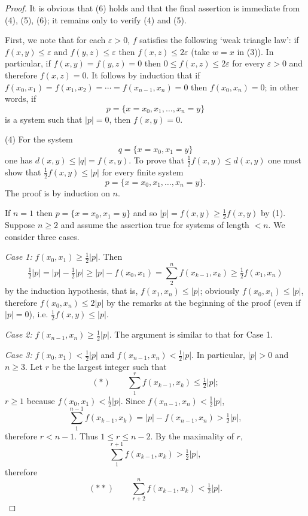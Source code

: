 \begin{proof}
    It is obvious that (6) holds and that the final assertion is immediate from (4), (5), (6); it remains only to verify (4) and (5).

    First, we note that for each $\varepsilon > 0$, $f$ satisfies the following ‘weak triangle law’: if $f(x,y) \le \varepsilon$ and $f(y,z) \le \varepsilon$ then $f(x,z) \le 2\varepsilon$ (take $w = x$ in (3)). In particular, if $f(x,y) = f(y,z) = 0$ then $0 \le f(x,z) \le 2\varepsilon$ for every $\varepsilon > 0$ and therefore $f(x,z) = 0$. It follows by induction that if $f(x_0,x_1) = f(x_1,x_2) = \cdots = f(x_{n-1},x_n) = 0$ then $f(x_0,x_n) = 0$; in other words, if
    \[
        p = \{x = x_0, x_1, \dots, x_n = y\}
    \]
    is a system such that $|p| = 0$, then $f(x,y) = 0$.

    (4) For the system
    \[
        q = \{x = x_0, x_1 = y\}
    \]
    one has $d(x,y) \le |q| = f(x,y)$.
    To prove that $\tfrac{1}{2}f(x,y) \le d(x,y)$ one must show that $\tfrac{1}{2}f(x,y) \le |p|$ for every finite system
    \[
        p = \{x = x_0, x_1, \dots, x_n = y\}.
    \]
    The proof is by induction on $n$.

    If $n=1$ then $p = \{x = x_0, x_1 = y\}$ and so $|p| = f(x,y) \ge \tfrac{1}{2}f(x,y)$ by (1). Suppose $n \ge 2$ and assume the assertion true for systems of length $< n$. We consider three cases.

    \textit{Case 1:} $f(x_0,x_1) \ge \tfrac{1}{2}|p|$. Then
    \[
        \tfrac{1}{2}|p| = |p| - \tfrac{1}{2}|p| \ge |p| - f(x_0,x_1) = \sum_2^n f(x_{k-1},x_k) \ge \tfrac{1}{2}f(x_1,x_n)
    \]
    by the induction hypothesis, that is, $f(x_1,x_n) \le |p|$; obviously $f(x_0,x_1) \le |p|$, therefore $f(x_0,x_n) \le 2|p|$ by the remarks at the beginning of the proof (even if $|p|=0$), i.e. $\tfrac{1}{2}f(x,y) \le |p|$.

    \textit{Case 2:} $f(x_{n-1},x_n) \ge \tfrac{1}{2}|p|$. The argument is similar to that for Case 1.

    \textit{Case 3:} $f(x_0,x_1) < \tfrac{1}{2}|p|$ and $f(x_{n-1},x_n) < \tfrac{1}{2}|p|$. In particular, $|p| > 0$ and $n \ge 3$. Let $r$ be the largest integer such that
    \begin{equation*}
        (*) \qquad \sum_1^r f(x_{k-1},x_k) \le \tfrac{1}{2}|p|;
    \end{equation*}
    $r \ge 1$ because $f(x_0,x_1) < \tfrac{1}{2}|p|$. Since $f(x_{n-1},x_n) < \tfrac{1}{2}|p|$,
    \[
        \sum_1^{n-1} f(x_{k-1},x_k) = |p| - f(x_{n-1},x_n) > \tfrac{1}{2}|p|,
    \]
    therefore $r < n - 1$. Thus $1 \le r \le n - 2$. By the maximality of $r$,
    \[
        \sum_1^{r+1} f(x_{k-1},x_k) > \tfrac{1}{2}|p|,
    \]
    therefore
    \begin{equation*}
        (**) \qquad \sum_{r+2}^n f(x_{k-1},x_k) < \tfrac{1}{2}|p|.
    \end{equation*}


\end{proof}
